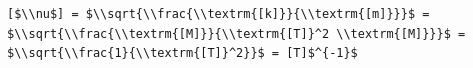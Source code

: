 \documentclass[border=10pt]{standalone}
\begin{document}
\begin{lstlisting}
[$\\nu$] = $\\sqrt{\\frac{\\textrm{[k]}}{\\textrm{[m]}}}$ = $\\sqrt{\\frac{\\textrm{[M]}}{\\textrm{[T]}^2 \\textrm{[M]}}}$ = $\\sqrt{\\frac{1}{\\textrm{[T]}^2}}$ = [T]$^{-1}$
\end{lstlisting}
\end{document}
